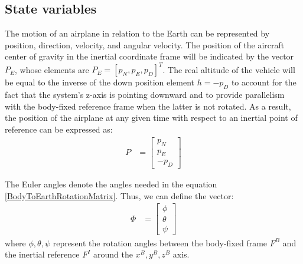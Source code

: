 \documentclass[twocolumn,showpacs,
    nofootinbib,aps,superscriptaddress,
    eqsecnum,prd,showkeys,10pt,floatfix]{revtex4}
\begin{document}
\subsection{State variables}
The motion of an airplane in relation to the Earth can be represented by
position, direction, velocity, and angular velocity. The position of the
aircraft center of gravity in the inertial coordinate frame will be indicated
by the vector $P_E$, whose elements are $P_E={[p_N,p_E,p_D]}^T$. The real
altitude of the vehicle will be equal to the inverse of the down position
element $h=-p_D$ to account for the fact that the system's z-axis is pointing
downward and to provide parallelism with the body-fixed reference frame when
the latter is not rotated. As a result, the position of the airplane at any
given time with respect to an inertial point of reference can be expressed as:
\begin{align}
    P & = \begin{bmatrix}
              p_N \\
              p_E \\
              -p_D
          \end{bmatrix}
    \label{PostionVectorInInertialMatrixWithInverseDownComponent}
\end{align}
\par
The Euler angles denote the angles needed in the equation
    {\ref{BodyToEarthRotationMatrix}}. Thus, we can define the vector:
\begin{align}
    \varPhi & = \begin{bmatrix}
                    \phi   \\
                    \theta \\
                    \psi
                \end{bmatrix}
    \label{EulerAnglesVector}
\end{align}
where $\phi,\theta,\psi$ represent the rotation angles between the body-fixed frame $F^B$ and the inertial reference $F^I$ around the $x^B,y^B,z^B$ axis.
\end{document}
